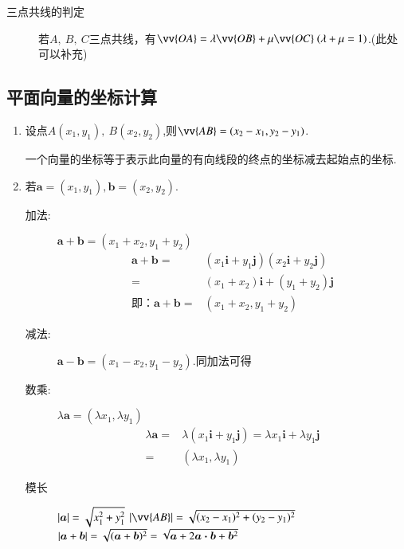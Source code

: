\documentclass{BHCexam}
\begin{document}
\begin{description}
\item[三点共线的判定] 若$ A,~B,~C $三点共线，有$ \vv{OA}=\lambda \vv{OB}+\mu\vv{OC}~(\lambda+\mu=1) $.(此处可以补充)
%
\end{description}
\subsection{平面向量的坐标计算}
\begin{enumerate}
\item  设点$ A(x_1,y_1),~B(x_2,y_2) $,则$ \vv{AB}=(x_2-x_1,y_2-y_1) $.\par 
一个向量的坐标等于表示此向量的有向线段的终点的坐标减去起始点的坐标.
\item 若$\bm{a}=\left(x_1,y_1\right),\bm{b}=\left(x_2,y_2\right)$.
\begin{description}
\item[加法:] $\bm{a}+\bm{b}=(x_1+x_2,y_1+y_2)$
\begin{equation*}
\begin{aligned}
\bm{a}+\bm{b}=&\left(x_1\bm{i}+y_1\bm{j}\right)\left(x_2\bm{i}+y_2\bm{j}\right)\\
=&\left(x_1+x_2\right)\bm{i}+\left(y_1+y_2\right)\bm{j}\\
\text{即：}\bm{a}+\bm{b}=&(x_1+x_2,y_1+y_2)
\end{aligned}
\end{equation*}
\item[减法:] $\bm{a}-\bm{b}=\left(x_1-x_2,y_1-y_2\right)$.同加法可得
\item[数乘:] $ \lambda \bm{a}=\left(\lambda x_1,\lambda y_1\right) $\begin{equation*}
\begin{aligned}
 \lambda \bm{a} =&\lambda\left(x_1\bm{i}+y_1\bm{j}\right)=\lambda x_1\bm{i}+\lambda y_1\bm{j}\\
=&\left(\lambda x_1,\lambda y_1\right)
\end{aligned}
\end{equation*}

\item[模长]
 $\left|\bm{a}\right|=\sqrt{x_1^2+y_1^2}$\qquad
 $\abs{\vv{AB}}=\sqrt{(x_2-x_1)^2+(y_2-y_1)^2}$\\
\qquad $\left|\bm{a}+\bm{b}\right|=\sqrt{(\bm{a}+\bm{b})^2}=\sqrt{\bm{a}+2\bm{a}\bm{\cdot}\bm{b}+\bm{b}^2}$\\


\end{description}
\end{enumerate}
\end{document}
